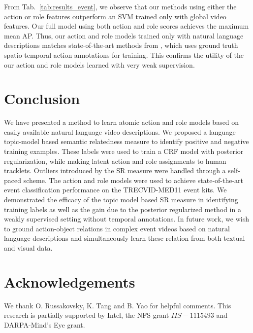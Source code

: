 \documentclass[10pt,twocolumn,letterpaper]{article}
\begin{document}
From Tab.~\ref{tab:results_event}, we observe that our methods using either the
action or role features outperform an SVM trained only with global video
features. Our full model using both action and role scores achieves the maximum
mean AP. Thus, our action and role models trained only with natural language
descriptions matches state-of-the-art methods from \cite{Izadinia_ECCV12},
which uses ground truth spatio-temporal action annotations for training. This
confirms the utility of the our action and role models learned with very weak
supervision.

\section{Conclusion}
We have presented a method to learn atomic action and role models based on easily available natural language video descriptions. We proposed a language topic-model based semantic relatedness measure to identify positive and negative training examples. These labels were used to train a CRF model with posterior regularization, while making latent action and role assignments to human tracklets. Outliers introduced by the SR measure were handled through a self-paced scheme. The action and role models were used to achieve state-of-the-art event classification performance on the TRECVID-MED11 event kits. We demonstrated the efficacy of the topic model based SR measure in identifying training labels as well as the gain due to the posterior regularized method in a weakly supervised setting without temporal annotations. In future work, we wish to ground action-object relations in complex event videos based on natural language descriptions and simultaneously learn these relation from both textual and visual data.

\section*{Acknowledgements}
We thank O. Russakovsky, K. Tang and B. Yao for helpful comments. This research is partially supported by Intel, 
the NFS grant $IIS-1115493$ and DARPA-Mind's Eye grant.


{\small


}
\end{document}
